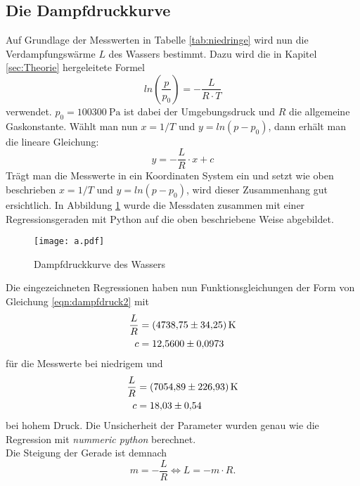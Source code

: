 \subsection{Die Dampfdruckkurve}
Auf Grundlage der Messwerten in Tabelle \ref{tab:niedringe} wird nun die Verdampfungswärme $L$ des
Wassers bestimmt. Dazu wird die in Kapitel \ref{sec:Theorie} hergeleitete Formel
\begin{equation}
  ln(\frac{p}{p_0})=-\frac{L}{R\cdot T} \label{eqn:dampfdruck1}
\end{equation}
verwendet. $p_0=\SI{100300}{\pascal}$ ist dabei der Umgebungsdruck und $R$ die allgemeine Gaskonstante.
Wählt man nun $x=1/T$ und $y=ln(p-p_0)$, dann erhält man die lineare Gleichung:
\begin{equation}
  y=-\frac{L}{R}\cdot x+c \label{eqn:dampfdruck2}
\end{equation}
Trägt man die Messwerte in ein Koordinaten System ein und setzt wie oben beschrieben $x=1/T$ und $y=ln(p-p_0)$,
wird dieser Zusammenhang gut ersichtlich. In Abbildung \ref{fig:Dampfdruckkurve} wurde die Messdaten
zusammen mit einer Regressionsgeraden mit Python auf die oben beschriebene Weise abgebildet. 
\begin{figure}
  \centering
  \texttt{[image: a.pdf]}
  \caption{Dampfdruckkurve des Wassers}
  \label{fig:Dampfdruckkurve}
\end{figure}
Die eingezeichneten Regressionen haben nun Funktionsgleichungen der Form von Gleichung \eqref{eqn:dampfdruck2} mit
\begin{align}
  \frac{L}{R} &= \SI{4738.75 \pm 34.25}{\kelvin} \\
  c           &= \num{12.56 \pm 0.0973} 
\end{align}
für die Messwerte bei niedrigem und
\begin{align}
  \frac{L}{R} &=  \SI{7054.89 \pm 226.93}{\kelvin}\\
  c           & =\num{18.03 \pm 0.54}
\end{align}
bei hohem Druck. Die Unsicherheit der Parameter wurden genau wie die Regression mit \textit{nummeric python} 
berechnet.
\\
Die Steigung der Gerade ist demnach
\begin{equation}
  m=-\frac{L}{R} \Leftrightarrow L=-m\cdot R. \label{eqn:L}
\end{equation}

